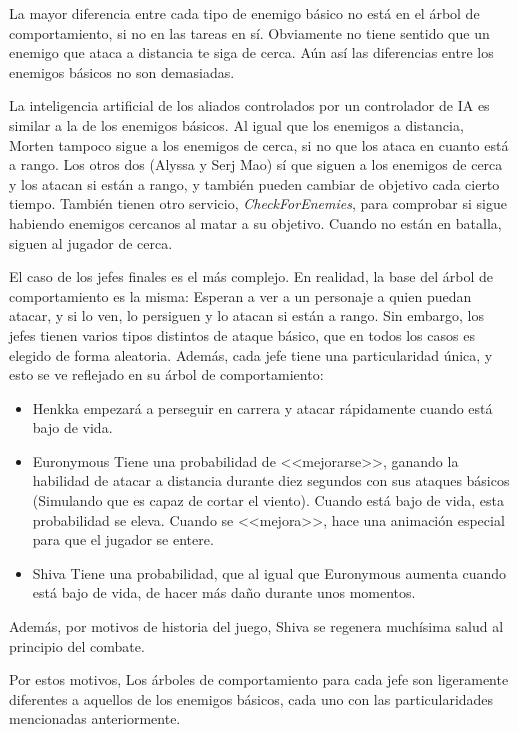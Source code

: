 La mayor diferencia entre cada tipo de enemigo básico no está en el árbol de comportamiento, si no en las tareas en sí. Obviamente no tiene sentido que un enemigo que ataca a distancia te siga de cerca. Aún así las diferencias entre los enemigos básicos no son demasiadas.


La inteligencia artificial de los aliados controlados por un controlador de {IA} es similar a la de los enemigos básicos. Al igual que los enemigos a distancia, Morten tampoco sigue a los enemigos de cerca, si no que los ataca en cuanto está a rango. Los otros dos (Alyssa y Serj Mao) sí que siguen a los enemigos de cerca y los atacan si están a rango, y también pueden cambiar de objetivo cada cierto tiempo. También tienen otro servicio, \textit{CheckForEnemies}, para comprobar si sigue habiendo enemigos cercanos al matar a su objetivo. Cuando no están en batalla, siguen al jugador de cerca.


El caso de los jefes finales es el más complejo. En realidad, la base del árbol de comportamiento es la misma: Esperan a ver a un personaje a quien puedan atacar, y si lo ven, lo persiguen y lo atacan si están a rango. Sin embargo, los jefes tienen varios tipos distintos de ataque básico, que en todos los casos es elegido de forma aleatoria. Además, cada jefe tiene una particularidad única, y esto se ve reflejado en su árbol de comportamiento:

\begin{itemize}
\item Henkka empezará a perseguir en carrera y atacar rápidamente cuando está bajo de vida.
\item Euronymous Tiene una probabilidad de <<mejorarse>>, ganando la habilidad de atacar a distancia durante diez segundos con sus ataques básicos (Simulando que es capaz de cortar el viento). Cuando está bajo de vida, esta probabilidad se eleva. Cuando se <<mejora>>, hace una animación especial para que el jugador se entere.
\item Shiva Tiene una probabilidad, que al igual que Euronymous aumenta cuando está bajo de vida, de hacer más daño durante unos momentos.
\end{itemize}

Además, por motivos de historia del juego, Shiva se regenera muchísima salud al principio del combate.


Por estos motivos, Los árboles de comportamiento para cada jefe son ligeramente diferentes a aquellos de los enemigos básicos, cada uno con las particularidades mencionadas anteriormente.

